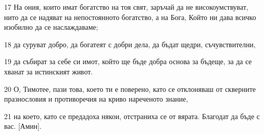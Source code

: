 \par 17 На ония, които имат богатство на тоя свят, заръчай да не високоумствуват, нито да се надяват на непостоянното богатство, а на Бога, Който ни дава всичко изобилно да се наслаждаваме;
\par 18 да суруват добро, да богатеят с добри дела, да бъдат щедри, съчувствителни,
\par 19 да събират за себе си имот, който ще бъде добра основа за бъдеще, за да се хванат за истинският живот.
\par 20 О, Тимотее, пази това, което ти е поверено, като се отклоняваш от скверните празнословия и противоречия на криво нареченото знание,
\par 21 на което, като се предадоха някои, отстраниха се от вярата. Благодат да бъде с вас. [Амин].

